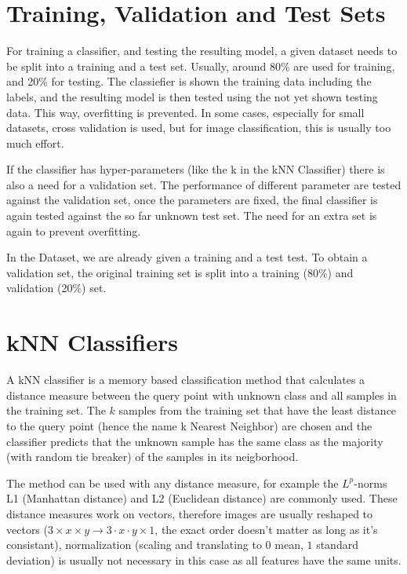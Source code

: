 \section{Training, Validation and Test Sets} %
For training a classifier, and testing the resulting model, a given dataset needs to be split into a training and a test set. Usually, around 80\% are used for training, and 20\% for testing. The classiefier is shown the training data including the labels, and the resulting model is then tested using the not yet shown testing data. This way, overfitting is prevented. In some cases, especially for small datasets, cross validation is used, but for image classification, this is usually too much effort. 

If the classifier has hyper-parameters (like the k in the kNN Classifier) there is also a need for a validation set. The performance of different parameter are tested against the validation set, once the parameters are fixed, the final classifier is again tested against the so far unknown test set. The need for an extra set is again to prevent overfitting.

In the  Dataset, we are already given a training and a test test. To obtain a validation set, the original training set is split into a training (80\%) and validation (20\%) set. 

\section{kNN Classifiers} %
A kNN classifier is a memory based classification method that calculates a distance measure between the query point with unknown class and all samples in the training set. The $k$ samples from the training set that have the least distance to the query point (hence the name k Nearest Neighbor) are chosen and the classifier predicts that the unknown sample has the same class as the majority (with random tie breaker) of the samples in its neigborhood.

The method can be used with any distance measure, for example the $L^p$-norms L1 (Manhattan distance) and L2 (Euclidean distance) are commonly used. These distance  measures work on vectors, therefore images are usually reshaped to vectors (${3 \times x \times y \to 3\cdot x \cdot y \times 1}$, the exact order doesn't matter as long as it's consistant), normalization (scaling and translating to $0$ mean, $1$ standard deviation) is usually not necessary in this case as all features have the same units. 

